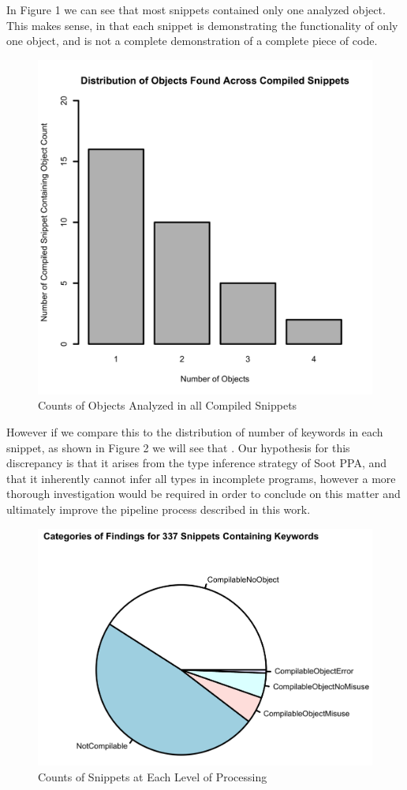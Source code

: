 \documentclass[10pt, conference]{IEEEtran}
\begin{document}
In Figure 1 we can see that most snippets contained only one analyzed object. This makes sense, in that each snippet is demonstrating the functionality of only one object, and is not a complete demonstration of a complete piece of code. 
\begin{figure}[h]
\begin{center}
\includegraphics[width=0.7\linewidth]{ObjectDist.png}
\caption{Counts of Objects Analyzed in all Compiled Snippets}
\end{center}
\end{figure}

However if we compare this to the distribution of number of keywords in each snippet, as shown in Figure 2 we will see that . Our hypothesis for this discrepancy is that it arises from the type inference strategy of Soot PPA, and that it inherently cannot infer all types in incomplete programs, however a more thorough investigation would be required in order to conclude on this matter and ultimately improve the pipeline process described in this work. 

\begin{figure}[h]
\begin{center}
\includegraphics[width=0.9\linewidth]{Pie.png}
\caption{Counts of Snippets at Each Level of Processing}
\end{center}
\end{figure}
\end{document}
